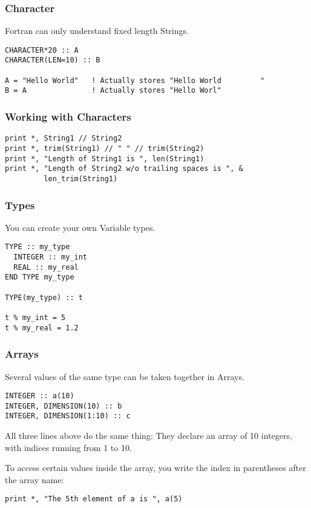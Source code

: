 \begin{frame}[fragile]
  \frametitle{Character}

  Fortran can only understand fixed length Strings. 
  
  \begin{lstlisting}
CHARACTER*20 :: A
CHARACTER(LEN=10) :: B

A = "Hello World"   ! Actually stores "Hello World         "
B = A               ! Actually stores "Hello Worl"
  \end{lstlisting}

\end{frame}

\begin{frame}[fragile]
  \frametitle{Working with Characters}

  \begin{lstlisting}
print *, String1 // String2
print *, trim(String1) // " " // trim(String2)
print *, "Length of String1 is ", len(String1)
print *, "Length of String2 w/o trailing spaces is ", &
         len_trim(String1)
  \end{lstlisting}

\end{frame}

\begin{frame}[fragile]
  \frametitle{Types}

  You can create your own Variable types.

  \begin{lstlisting}
TYPE :: my_type
  INTEGER :: my_int
  REAL :: my_real
END TYPE my_type

TYPE(my_type) :: t

t % my_int = 5
t % my_real = 1.2
  \end{lstlisting}

\end{frame}

\begin{frame}[fragile]
  \frametitle{Arrays}
  Several values of the same type can be taken together in Arrays.

  \begin{lstlisting}
INTEGER :: a(10)
INTEGER, DIMENSION(10) :: b
INTEGER, DIMENSION(1:10) :: c
  \end{lstlisting}

  All three lines above do the same thing: They declare an array of 10 integers, with indices running from 1 to 10.

  To access certain values inside the array, you write the index in parentheses after the array name:

  \begin{lstlisting}[numbers=none]
print *, "The 5th element of a is ", a(5)
  \end{lstlisting}
\end{frame}

